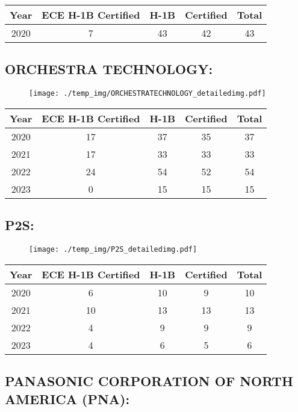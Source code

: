 \documentclass{article}%
\begin{document}
%
\begin{longtable}{c|c|c|c|c}%
\hline%
Year&ECE H{-}1B Certified&H{-}1B&Certified&Total\\%
\hline%
2020&7&43&42&43\\%
\hline%
\end{longtable}

%
\newpage%
\subsection{ORCHESTRA TECHNOLOGY:}%
\label{subsec:ORCHESTRATECHNOLOGY}%
\label{ORCHESTRATECHNOLOGYdetailed}%


\begin{figure}[htbp]%
\centering%
\texttt{[image: ./temp\_img/ORCHESTRATECHNOLOGY\_detailedimg.pdf]}%
\end{figure}

%
\begin{longtable}{c|c|c|c|c}%
\hline%
Year&ECE H{-}1B Certified&H{-}1B&Certified&Total\\%
\hline%
2020&17&37&35&37\\%
\hline%
2021&17&33&33&33\\%
\hline%
2022&24&54&52&54\\%
\hline%
2023&0&15&15&15\\%
\hline%
\end{longtable}

%
\newpage%
\subsection{P2S:}%
\label{subsec:P2S}%
\label{P2Sdetailed}%


\begin{figure}[htbp]%
\centering%
\texttt{[image: ./temp\_img/P2S\_detailedimg.pdf]}%
\end{figure}

%
\begin{longtable}{c|c|c|c|c}%
\hline%
Year&ECE H{-}1B Certified&H{-}1B&Certified&Total\\%
\hline%
2020&6&10&9&10\\%
\hline%
2021&10&13&13&13\\%
\hline%
2022&4&9&9&9\\%
\hline%
2023&4&6&5&6\\%
\hline%
\end{longtable}

%
\newpage%
\subsection{PANASONIC CORPORATION OF NORTH AMERICA (PNA):}%
\label{subsec:PANASONICCORPORATIONOFNORTHAMERICA(PNA)}%
\label{PANASONICCORPORATIONOFNORTHAMERICAPNAdetailed}%
\end{document}
